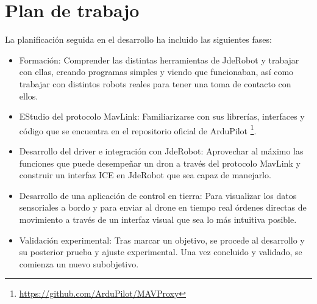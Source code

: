 \section{Plan de trabajo}
La planificación seguida en el desarrollo ha incluido las siguientes fases:

\begin{itemize}
\item{Formación:} Comprender las distintas herramientas de JdeRobot y trabajar con ellas, creando programas simples y viendo que funcionaban, así como trabajar con distintos robots reales para tener una toma de contacto con ellos. 

\item{EStudio del protocolo MavLink:} Familiarizarse con sus librerías, interfaces y código que se encuentra en el repositorio oficial de ArduPilot \footnote{\url{https://github.com/ArduPilot/MAVProxy}}.

\item{Desarrollo del driver e integración con JdeRobot:} Aprovechar al máximo las funciones que puede desempeñar un dron a través del protocolo MavLink y construir un interfaz ICE en JdeRobot que sea capaz de manejarlo.

\item{Desarrollo de una aplicación de control en tierra:} Para visualizar los datos sensoriales a bordo y para enviar al drone en tiempo real órdenes directas de movimiento a través de un interfaz visual que sea lo más intuitiva posible.

\item{Validación experimental:} Tras marcar un objetivo, se procede al desarrollo y su posterior prueba y ajuste experimental. Una vez concluido y validado, se comienza un nuevo subobjetivo.

\end{itemize}
